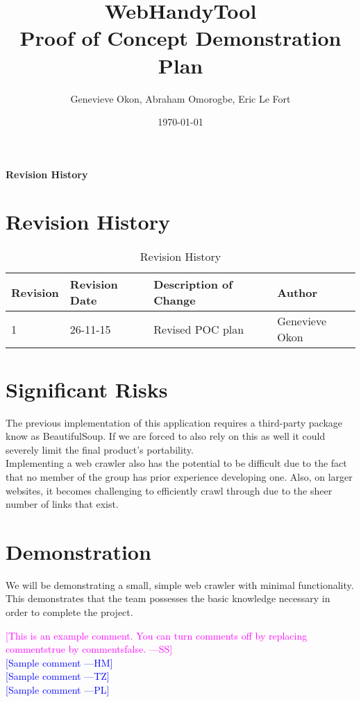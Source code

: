 \documentclass[12pt]{article}
\newcommand{\authornote}[3]{\textcolor{#1}{[#3 ---#2]}}
\newcommand{\authornote}[3]{}
\newcommand{\wss}[1]{\authornote{magenta}{SS}{#1}}
\newcommand{\hm}[1]{\authornote{blue}{HM}{#1}} %
\newcommand{\tz}[1]{\authornote{blue}{TZ}{#1}} %
\newcommand{\pl}[1]{\authornote{blue}{PL}{#1}} %
\begin{document}
\title{WebHandyTool \\
 Proof of Concept Demonstration Plan }
\author{Genevieve Okon, Abraham Omorogbe, Eric Le Fort}
\date{\today}
\maketitle


\tableofcontents

\listoftables

\textbf{Revision History} \\ \normalsize
\pagebreak

\section{Revision History}
\begin{table}[h!]
	\begin{tabular}{| p{5cm} | p{5cm} | p{5cm} |p{5cm} |}    \hline
Revision  &Revision Date &Description of Change &Author\\ \hline
1& 26-11-15&Revised POC plan&Genevieve Okon\\ \hline

       \end{tabular}
       
       \caption{Revision History}
       \label{table:Revision History}
\end{table}



\section{Significant Risks}
The previous implementation of this application requires a third-party package know as BeautifulSoup. If we are forced to also rely on this as well it could severely limit the final product's portability.\\

Implementing a web crawler also has the potential to be difficult due to the fact that no member of the group has prior experience developing one. Also, on larger websites, it becomes challenging to efficiently crawl through due to the sheer number of links that exist.\\

\section{Demonstration}
We will be demonstrating a small, simple web crawler with minimal functionality. This demonstrates that the team possesses the basic knowledge necessary in order to complete the project.

\noindent \wss{This is an example comment.  You can turn comments off by replacing
  commentstrue by commentsfalse.}\\
\hm{Sample comment}\\
\tz{Sample comment}\\
\pl{Sample comment}
\end{document}
